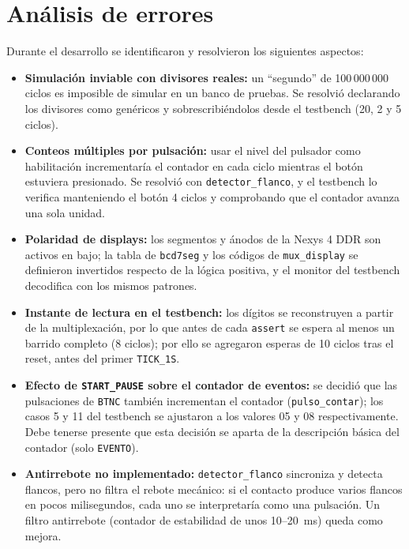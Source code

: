 \documentclass[letterpaper,12pt]{article}
\begin{document}
\section{Análisis de errores}
Durante el desarrollo se identificaron y resolvieron los siguientes aspectos:
\begin{itemize}
    \item \textbf{Simulación inviable con divisores reales:} un ``segundo'' de 100\,000\,000 ciclos es imposible de simular en un banco de pruebas. Se resolvió declarando los divisores como genéricos y sobrescribiéndolos desde el testbench (20, 2 y 5 ciclos).
    \item \textbf{Conteos múltiples por pulsación:} usar el nivel del pulsador como habilitación incrementaría el contador en cada ciclo mientras el botón estuviera presionado. Se resolvió con \texttt{detector\_flanco}, y el testbench lo verifica manteniendo el botón 4 ciclos y comprobando que el contador avanza una sola unidad.
    \item \textbf{Polaridad de displays:} los segmentos y ánodos de la Nexys 4 DDR son activos en bajo; la tabla de \texttt{bcd7seg} y los códigos de \texttt{mux\_display} se definieron invertidos respecto de la lógica positiva, y el monitor del testbench decodifica con los mismos patrones.
    \item \textbf{Instante de lectura en el testbench:} los dígitos se reconstruyen a partir de la multiplexación, por lo que antes de cada \texttt{assert} se espera al menos un barrido completo (8 ciclos); por ello se agregaron esperas de 10 ciclos tras el reset, antes del primer \texttt{TICK\_1S}.
    \item \textbf{Efecto de \texttt{START\_PAUSE} sobre el contador de eventos:} se decidió que las pulsaciones de \texttt{BTNC} también incrementan el contador (\texttt{pulso\_contar}); los casos 5 y 11 del testbench se ajustaron a los valores 05 y 08 respectivamente. Debe tenerse presente que esta decisión se aparta de la descripción básica del contador (solo \texttt{EVENTO}).
    \item \textbf{Antirrebote no implementado:} \texttt{detector\_flanco} sincroniza y detecta flancos, pero no filtra el rebote mecánico: si el contacto produce varios flancos en pocos milisegundos, cada uno se interpretaría como una pulsación. Un filtro antirrebote (contador de estabilidad de unos 10--20~ms) queda como mejora.
\end{itemize}
\end{document}
